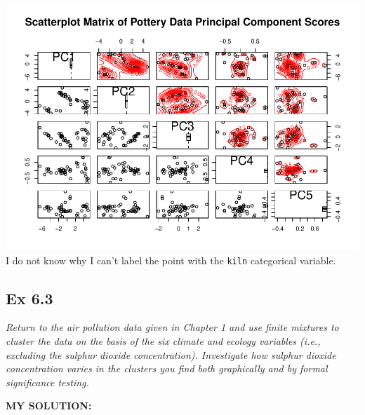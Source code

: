 \documentclass[
]{article}
\begin{document}
\includegraphics{HUDM6122-Homework_06-Chenguang-Pan_files/figure-latex/unnamed-chunk-5-1.pdf}
I do not know why I can't label the point with the \texttt{kiln}
categorical variable.

\hypertarget{ex-6.3}{%
\subsection{Ex 6.3}\label{ex-6.3}}

\emph{Return to the air pollution data given in Chapter 1 and use finite
mixtures to cluster the data on the basis of the six climate and ecology
variables (i.e., excluding the sulphur dioxide concentration).
Investigate how sulphur dioxide concentration varies in the clusters you
find both graphically and by formal significance testing.}

\textbf{MY SOLUTION:}
\end{document}
